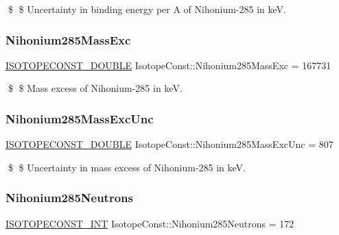 \$ \$ Uncertainty in binding energy per A of Nihonium-\/285 in keV. \mbox{\label{group___isotope_const-_nihonium-_nh285_ga076b1af3f1eb2cfd13af257827e89132}} 
\subsubsection{\texorpdfstring{Nihonium285\+Mass\+Exc}{Nihonium285MassExc}}
{\footnotesize\ttfamily \mbox{\hyperlink{group___isotope_const-_macros_ga8f45a7272ce02c0b4c65c44636ed719a}{I\+S\+O\+T\+O\+P\+E\+C\+O\+N\+S\+T\+\_\+\+D\+O\+U\+B\+LE}} Isotope\+Const\+::\+Nihonium285\+Mass\+Exc = 167731}

\$ \$ Mass excess of Nihonium-\/285 in keV. \mbox{\label{group___isotope_const-_nihonium-_nh285_ga47bc4d1ec2e946d4d7db998803c7ac9f}} 
\subsubsection{\texorpdfstring{Nihonium285\+Mass\+Exc\+Unc}{Nihonium285MassExcUnc}}
{\footnotesize\ttfamily \mbox{\hyperlink{group___isotope_const-_macros_ga8f45a7272ce02c0b4c65c44636ed719a}{I\+S\+O\+T\+O\+P\+E\+C\+O\+N\+S\+T\+\_\+\+D\+O\+U\+B\+LE}} Isotope\+Const\+::\+Nihonium285\+Mass\+Exc\+Unc = 807}

\$ \$ Uncertainty in mass excess of Nihonium-\/285 in keV. \mbox{\label{group___isotope_const-_nihonium-_nh285_ga13e3d83e2a730c266ce2939226d52207}} 
\subsubsection{\texorpdfstring{Nihonium285\+Neutrons}{Nihonium285Neutrons}}
{\footnotesize\ttfamily \mbox{\hyperlink{group___isotope_const-_macros_ga5f18360b3e99483a35c32d789e62621c}{I\+S\+O\+T\+O\+P\+E\+C\+O\+N\+S\+T\+\_\+\+I\+NT}} Isotope\+Const\+::\+Nihonium285\+Neutrons = 172}

